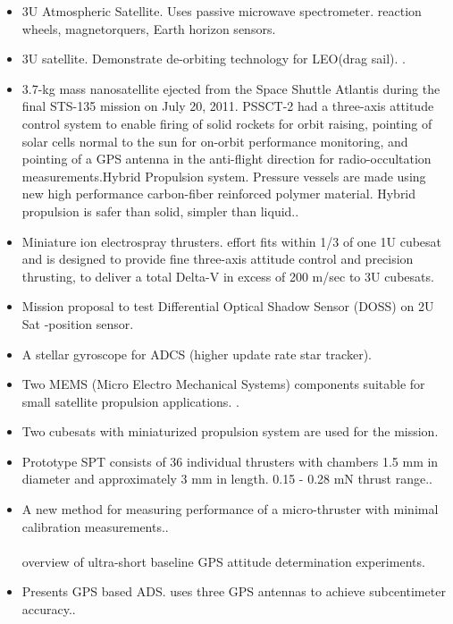 \begin{itemize}
\item 3U Atmospheric Satellite. Uses passive microwave spectrometer.  reaction wheels, magnetorquers, Earth horizon sensors\cite{Ref:Blackwell12}. 

\item 3U satellite. Demonstrate de-orbiting technology for LEO(drag sail). \cite{Ref:Shmuel12}. 

\item 3.7-kg mass nanosatellite ejected from the Space Shuttle Atlantis during the final STS-135 mission on July 20, 2011. PSSCT-2 had a three-axis attitude control system to enable firing of solid rockets for orbit raising, pointing of solar cells normal to the sun for on-orbit performance monitoring, and pointing of a GPS antenna in the anti-flight direction for radio-occultation measurements.Hybrid Propulsion system. Pressure vessels are made using new high performance carbon-fiber reinforced polymer material. Hybrid propulsion is safer than solid, simpler than liquid.\cite{Ref:Janson12}.

\item Miniature ion electrospray thrusters. effort fits within 1/3 of one 1U cubesat and is designed to provide fine three-axis attitude control and precision thrusting, to deliver a total Delta-V in excess of 200 m/sec to 3U cubesats\cite{Ref:Dushku12}. 

\item Mission proposal to test Differential Optical Shadow Sensor (DOSS) on 2U Sat   -position sensor\cite{Ref:Martel12}. 

\item A stellar gyroscope for ADCS (higher update rate star tracker)\cite{Ref:Zoellner12}. 

\item Two MEMS (Micro Electro Mechanical Systems) components suitable for small satellite propulsion applications. \cite{Ref:Rawashdeh12}. 
\item Two cubesats with miniaturized propulsion system are used for the mission\cite{Ref:Sundaramoorthy10}. 

\item Prototype SPT consists of 36 individual thrusters with chambers 1.5 mm in diameter and approximately 3 mm in length. 0.15 - 0.28 mN thrust range.\cite{Ref:Sathiyanathan10}. 
\item A new method for measuring performance of a micro-thruster with minimal calibration measurements.\cite{Ref:Chang08}. \\\\
overview of ultra-short baseline GPS attitude determination experiments\cite{Ref:Bageshwar06}. 
\item Presents GPS based ADS. uses three GPS antennas to achieve subcentimeter accuracy.\cite{Ref:Gershman06}. 


\end{itemize}
